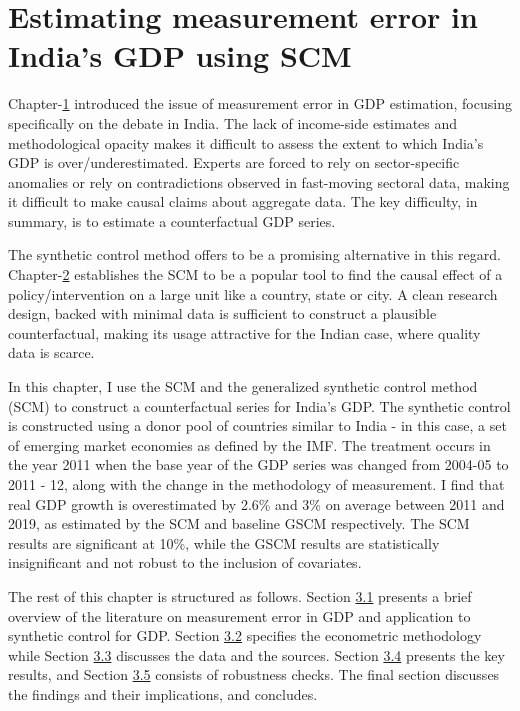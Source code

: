 \documentclass[12pt,nobind, a4paper]{reedthesis}
\begin{document}
 \hypertarget{ch3}{%
 \chapter{Estimating measurement error in India's GDP using SCM}\label{ch3}}

 Chapter-\protect\hyperlink{ch1}{1} introduced the issue of measurement error in GDP estimation, focusing specifically on the debate in India. The lack of income-side estimates and methodological opacity makes it difficult to assess the extent to which India's GDP is over/underestimated. Experts are forced to rely on sector-specific anomalies or rely on contradictions observed in fast-moving sectoral data, making it difficult to make causal claims about aggregate data. The key difficulty, in summary, is to estimate a counterfactual GDP series.
 \linebreak

 The synthetic control method offers to be a promising alternative in this regard. Chapter-\protect\hyperlink{ch2}{2} establishes the SCM to be a popular tool to find the causal effect of a policy/intervention on a large unit like a country, state or city. A clean research design, backed with minimal data is sufficient to construct a plausible counterfactual, making its usage attractive for the Indian case, where quality data is scarce.
 \linebreak

 In this chapter, I use the SCM and the generalized synthetic control method (SCM) to construct a counterfactual series for India's GDP. The synthetic control is constructed using a donor pool of countries similar to India - in this case, a set of emerging market economies as defined by the IMF. The treatment occurs in the year 2011 when the base year of the GDP series was changed from 2004-05 to 2011 - 12, along with the change in the methodology of measurement. I find that real GDP growth is overestimated by 2.6\% and 3\% on average between 2011 and 2019, as estimated by the SCM and baseline GSCM respectively. The SCM results are significant at 10\%, while the GSCM results are statistically insignificant and not robust to the inclusion of covariates.
 \linebreak

 The rest of this chapter is structured as follows. Section \protect\hyperlink{lit}{3.1} presents a brief overview of the literature on measurement error in GDP and application to synthetic control for GDP. Section \protect\hyperlink{ec}{3.2} specifies the econometric methodology while Section \protect\hyperlink{dat}{3.3} discusses the data and the sources. Section \protect\hyperlink{res}{3.4} presents the key results, and Section \protect\hyperlink{rob}{3.5} consists of robustness checks. The final section discusses the findings and their implications, and concludes.
\end{document}
